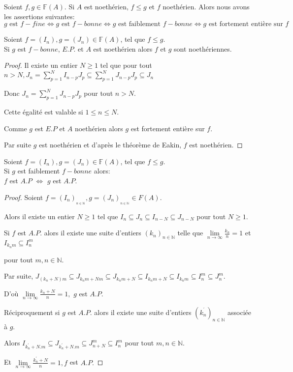 \begin{moncorollaire}
	Soient $f,g \in \mathbb{F}(A)$. Si $A$ est noethérien, $f \leqslant g$ et $f$ noethérien. Alors nous avons les assertions suivantes:
	\[ g \text{ est } f-fine \Longleftrightarrow  g \text{ est } f-bonne \Longleftrightarrow  g \text{ est faiblement } f-bonne \Longleftrightarrow  g \text{ est fortement entière sur } f \]
\end{moncorollaire}
\begin{maproposition}
	Soient $f=(I_n), g=(J_n) \in \mathbb{F}(A)$, tel que $f \leqslant g$.\\ Si $g$ est $f-bonne$, $E.P.$ et $A$ est noethérien alors $f$ et $g$ sont noethériennes.
\end{maproposition}
\begin{proof}
	Il existe un entier $N\geq 1$ tel que pour tout $n>N,J_{n}=\sum%
	\limits_{p=1}^{N}I_{n-p}J_{p}\subseteq
	\sum\limits_{p=1}^{N}J_{n-p}J_{p}\subseteq J_{n}$
	
	Donc $J_{n}=\sum\limits_{p=1}^{N}J_{n-p}J_{p}$ pour tout $n>N.$
	
	Cette égalité est valable si $1\leq n\leq N.$
	
	Comme $g$ est $E.P$ et $A$ noethérien alors $g$ est fortement entière sur $f.$ 
	
	Par suite $g$ est noethérien et d'après le théorème de
	Eakin, $f$ est noethérien. 
\end{proof}
\begin{maproposition}
	Soient $f=(I_n), g=(J_n) \in \mathbb{F}(A)$, tel que $f \leqslant g$.\\Si $g$ est faiblement $f-bonne$ alors:\\ $f$ est $A.P$ $\Longleftrightarrow$ $g$ est $A.P$.
\end{maproposition}
\begin{proof}
	Soient $f=(I_{n})_{_{n\in \mathbb{N}}},g=(J_{n})_{_{n\in\mathbb{N}}}\in F(A).$
	
	Alors il existe un entier $N\geq 1$ tel que $I_{n}\subseteq J_{n}\subseteq
	I_{n-N}\subseteq J_{n-N}$ pour tout $N\geq 1.$
	
	Si $f$ est $A.P.$ alors il existe une suite d'entiers $(k_{n})_{n\in \mathbb{N}}$ telle que $\underset{n\longrightarrow \infty }{\lim }\frac{k_{n}}{n}=1$
	et $I_{k_{n}m}\subseteq I_{n}^{m}$
	
	pour tout $m,n\in \mathbb{N}.$
	
	Par suite, $J_{(k_{n}+N)m}\subseteq J_{k_{n}m+Nm}\subseteq
	J_{k_{n}m+N}\subseteq I_{k_{n}m+N}\subseteq I_{k_{n}m}\subseteq
	I_{n}^{m}\subseteq J_{n}^{m}.$
	
	D'où $\underset{n\longrightarrow \infty }{\lim }\frac{k_{n}+N}{n%
	}=1,$ $g$ est $A.P.$
	
	Réciproquement si $g$ est $A.P.$ alors il existe une suite d'entiers $(k_{n}^{^{\prime }})_{n\in \mathbb{N}}$ associée à $g.$
	
	Alors $I_{k_{n}^{\prime }+N.m}\subseteq J_{k_{n}^{\prime }+N.m}\subseteq
	J_{n+N}^{m}\subseteq I_{n}^{m}$ pour tout $m,n\in \mathbb{N}.$
	
	Et $\underset{n\longrightarrow \infty }{\lim }\frac{k_{n}^{\prime }+N}{n}=1,f
	$ est $A.P.$
\end{proof}
